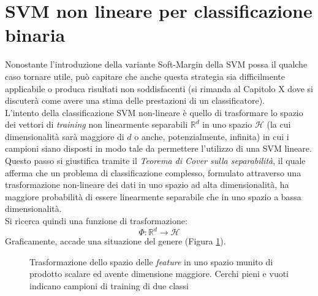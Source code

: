 \section{SVM non lineare per classificazione binaria}
Nonostante l'introduzione della variante Soft-Margin della SVM possa il qualche caso tornare utile, può capitare che anche questa strategia sia difficilmente applicabile o produca risultati non soddisfacenti (si rimanda al Capitolo X dove si discuterà come avere una stima delle prestazioni di un classificatore).
\\

L'intento della classificazione SVM non-lineare è quello di trasformare lo spazio dei vettori di \emph{training} non linearmente separabili $\mathbb{R}^d$ in uno spazio $\mathcal{H}$ (la cui dimensionalità sarà maggiore di $d$ o anche, potenzialmente, infinita) in cui i campioni siano disposti in modo tale da permettere l'utilizzo di una SVM lineare. Questo passo si giustifica tramite il \emph{Teorema di Cover sulla separabilità}, il quale afferma che un problema di classificazione complesso, formulato attraverso una trasformazione non-lineare dei dati in uno spazio ad alta dimensionalità, ha maggiore probabilità di essere linearmente separabile che in uno spazio a bassa dimensionalità.
\\
Si ricerca quindi una funzione di trasformazione:
\begin{equation}
\label{eq:funzione_di_trasformazione}
\Phi:\mathbb{R}^d\rightarrow\mathcal{H}
\end{equation}
Graficamente, accade una situazione del genere (Figura \ref{fig:funzione_di_trasformazione}).
 \begin{figure}[!ht]
    \caption{Trasformazione dello spazio delle \emph{feature} in uno spazio munito di prodotto scalare ed avente dimensione maggiore. Cerchi pieni e vuoti indicano campioni di training di due classi}
    \label{fig:funzione_di_trasformazione}
  \end{figure}
